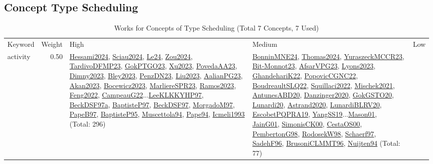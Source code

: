 \clearpage
\subsection{Concept Type Scheduling}
\label{sec:Scheduling}
\label{Scheduling}
{\scriptsize
\begin{longtable}{p{3cm}r>{\raggedright\arraybackslash}p{6cm}>{\raggedright\arraybackslash}p{6cm}>{\raggedright\arraybackslash}p{8cm}}
\rowcolor{white}\caption{Works for Concepts of Type Scheduling (Total 7 Concepts, 7 Used)}\\ \toprule
\rowcolor{white}Keyword & Weight & High & Medium & Low\\ \midrule\endhead
\bottomrule
\endfoot
\index{activity}\index{Scheduling!activity}activity &  0.50 & \hyperref[detail:Hessami2024]{Hessami2024}, \hyperref[detail:Sciau2024]{Sciau2024}, \hyperref[detail:Le24]{Le24}, \hyperref[detail:Zou2024]{Zou2024}, \hyperref[detail:TardivoDFMP23]{TardivoDFMP23}, \hyperref[detail:GokPTGO23]{GokPTGO23}, \hyperref[detail:Xu2023]{Xu2023}, \hyperref[detail:PovedaAA23]{PovedaAA23}, \hyperref[detail:Dimny2023]{Dimny2023}, \hyperref[detail:Bley2023]{Bley2023}, \hyperref[detail:PenzDN23]{PenzDN23}, \hyperref[detail:Liu2023]{Liu2023}, \hyperref[detail:AalianPG23]{AalianPG23}, \hyperref[detail:Akan2023]{Akan2023}, \hyperref[detail:Bocewicz2023]{Bocewicz2023}, \hyperref[detail:MarliereSPR23]{MarliereSPR23}, \hyperref[detail:Ramos2023]{Ramos2023}, \hyperref[detail:Feng2022]{Feng2022}, \hyperref[detail:CampeauG22]{CampeauG22}...\hyperref[detail:LeeKLKKYHP97]{LeeKLKKYHP97}, \hyperref[detail:BeckDSF97a]{BeckDSF97a}, \hyperref[detail:BaptisteP97]{BaptisteP97}, \hyperref[detail:BeckDSF97]{BeckDSF97}, \hyperref[detail:MorgadoM97]{MorgadoM97}, \hyperref[detail:PapeB97]{PapeB97}, \hyperref[detail:BaptisteP95]{BaptisteP95}, \hyperref[detail:Muscettola94]{Muscettola94}, \hyperref[detail:Pape94]{Pape94}, \hyperref[detail:Icmeli1993]{Icmeli1993} (Total: 296) & \hyperref[detail:BonninMNE24]{BonninMNE24}, \hyperref[detail:Thomas2024]{Thomas2024}, \hyperref[detail:YuraszeckMCCR23]{YuraszeckMCCR23}, \hyperref[detail:Bit-Monnot23]{Bit-Monnot23}, \hyperref[detail:AfsarVPG23]{AfsarVPG23}, \hyperref[detail:Lyons2023]{Lyons2023}, \hyperref[detail:GhandehariK22]{GhandehariK22}, \hyperref[detail:PopovicCGNC22]{PopovicCGNC22}, \hyperref[detail:BoudreaultSLQ22]{BoudreaultSLQ22}, \hyperref[detail:Squillaci2022]{Squillaci2022}, \hyperref[detail:Mischek2021]{Mischek2021}, \hyperref[detail:AntunesABD20]{AntunesABD20}, \hyperref[detail:Danzinger2020]{Danzinger2020}, \hyperref[detail:GokGSTO20]{GokGSTO20}, \hyperref[detail:Lunardi20]{Lunardi20}, \hyperref[detail:Astrand2020]{Astrand2020}, \hyperref[detail:LunardiBLRV20]{LunardiBLRV20}, \hyperref[detail:EscobetPQPRA19]{EscobetPQPRA19}, \hyperref[detail:YangSS19]{YangSS19}...\hyperref[detail:Mason01]{Mason01}, \hyperref[detail:JainG01]{JainG01}, \hyperref[detail:SimonisCK00]{SimonisCK00}, \hyperref[detail:CestaOS00]{CestaOS00}, \hyperref[detail:PembertonG98]{PembertonG98}, \hyperref[detail:RodosekW98]{RodosekW98}, \hyperref[detail:Schaerf97]{Schaerf97}, \hyperref[detail:SadehF96]{SadehF96}, \hyperref[detail:BrusoniCLMMT96]{BrusoniCLMMT96}, \hyperref[detail:Nuijten94]{Nuijten94} (Total: 77) & 
\end{longtable}}
